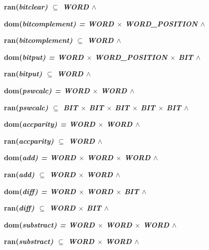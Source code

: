 \begin{sloppypar}
\hspace*{0.10in}\bf ran\rm (\it bitclear\rm )  $\subseteq$  \it WORD  $\land$ 

\hspace*{0.10in}\bf dom\rm (\it bitcomplement\rm ) \rm = \it WORD $\times$ \it WORD\_POSITION  $\land$ 

\hspace*{0.10in}\bf ran\rm (\it bitcomplement\rm )  $\subseteq$  \it WORD  $\land$ 

\hspace*{0.10in}\bf dom\rm (\it bitput\rm ) \rm = \it WORD $\times$ \it WORD\_POSITION $\times$ \it BIT  $\land$ 

\hspace*{0.10in}\bf ran\rm (\it bitput\rm )  $\subseteq$  \it WORD  $\land$ 

\hspace*{0.10in}\bf dom\rm (\it pswcalc\rm ) \rm = \it WORD $\times$ \it WORD  $\land$ 

\hspace*{0.10in}\bf ran\rm (\it pswcalc\rm )  $\subseteq$  \it BIT $\times$ \it BIT $\times$ \it BIT $\times$ \it BIT $\times$ \it BIT  $\land$ 

\hspace*{0.10in}\bf dom\rm (\it accparity\rm ) \rm = \it WORD $\times$ \it WORD  $\land$ 

\hspace*{0.10in}\bf ran\rm (\it accparity\rm )  $\subseteq$  \it WORD  $\land$ 

\hspace*{0.10in}\bf dom\rm (\it add\rm ) \rm = \it WORD $\times$ \it WORD $\times$ \it WORD  $\land$ 

\hspace*{0.10in}\bf ran\rm (\it add\rm )  $\subseteq$  \it WORD $\times$ \it WORD  $\land$ 

\hspace*{0.10in}\bf dom\rm (\it diff\rm ) \rm = \it WORD $\times$ \it WORD $\times$ \it BIT  $\land$ 

\hspace*{0.10in}\bf ran\rm (\it diff\rm )  $\subseteq$  \it WORD $\times$ \it BIT  $\land$ 

\hspace*{0.10in}\bf dom\rm (\it substract\rm ) \rm = \it WORD $\times$ \it WORD $\times$ \it WORD  $\land$ 

\hspace*{0.10in}\bf ran\rm (\it substract\rm )  $\subseteq$  \it WORD $\times$ \it WORD  $\land$ 


\end{sloppypar}
